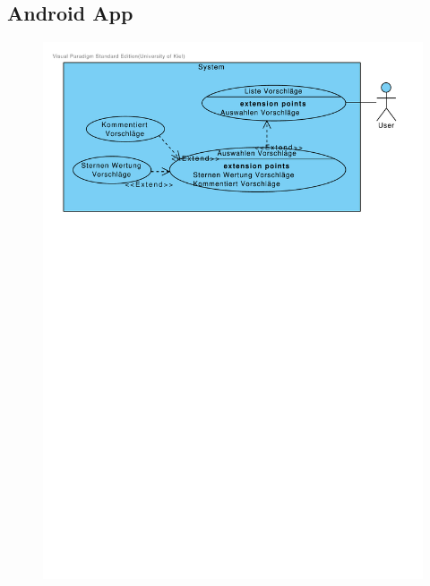 \documentclass[10pt,a4paper]{article}
\begin{document}
	\subsection{Android App}
	\begin{figure}[h]
		\includegraphics[width=\linewidth]{gfx/androidapp/vorschlage.pdf}
	\end{figure}
\end{document}

